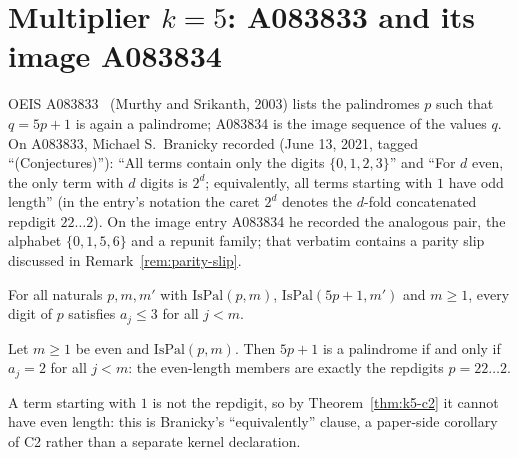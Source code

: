\providecommand{\IsPal}{\mathrm{IsPal}}
\makeatletter
{}
\makeatother

\section{Multiplier $k = 5$: A083833 and its image A083834}
\label{sec:k5}

OEIS A083833~\cite{oeis} (Murthy and Srikanth, 2003)
lists the palindromes $p$ such that $q = 5p+1$ is again
a palindrome; A083834 is the image sequence of the
values $q$. On A083833, Michael S.~Branicky recorded
(June 13, 2021, tagged ``(Conjectures)''): ``All terms
contain only the digits $\{0,1,2,3\}$'' and ``For $d$
even, the only term with $d$ digits is $2^d$;
equivalently, all terms starting with $1$ have odd
length'' (in the entry's notation the caret $2^d$
denotes the $d$-fold concatenated repdigit $22\ldots2$).
On the image entry A083834 he recorded the analogous
pair, the alphabet $\{0,1,5,6\}$ and a repunit family;
that verbatim contains a parity slip discussed in
Remark~\ref{rem:parity-slip}.

\begin{theorem}
\label{thm:k5-c1}
For all naturals $p, m, m'$ with $\IsPal(p,m)$,
$\IsPal(5p+1,m')$ and $m \ge 1$, every digit of $p$
satisfies $a_j \le 3$ for all $j < m$.
\end{theorem}

\begin{theorem}
\label{thm:k5-c2}
Let $m \ge 1$ be even and $\IsPal(p,m)$. Then $5p+1$ is
a palindrome if and only if $a_j = 2$ for all $j < m$:
the even-length members are exactly the repdigits
$p = 22\ldots2$.
\end{theorem}

A term starting with $1$ is not the repdigit, so by
Theorem~\ref{thm:k5-c2} it cannot have even length:
this is Branicky's ``equivalently'' clause, a
paper-side corollary of C2 rather than a separate
kernel declaration.

